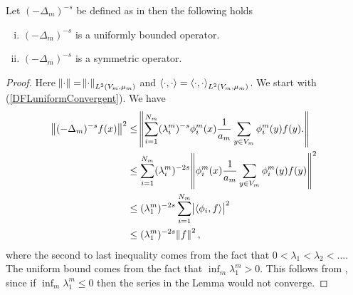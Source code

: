 \medskip
\begin{prop}\label{discreteFractionalLaplacianProperties}Let $(-\Delta_{m})^{-s}$ be defined as in  then the following holds
	\begin{enumerate}[(i)]
			\item $(-\Delta_{m})^{-s}$ is a uniformly bounded operator. \label{DFLuniformConvergent}
			\item $(-\Delta_{m})^{-s}$ is a symmetric operator. \label{DFLsymmetric}
	\end{enumerate}

\end{prop}
\begin{proof}
	Here $\norm{\cdot} = \norm{\cdot}_{L^2(V_m, \mu_m)}$ and $\left\langle \cdot, \cdot \right\rangle = \left\langle \cdot, \cdot \right\rangle_{L^2(V_m, \mu_m)}$. We start with (\ref{DFLuniformConvergent}). We have
	\begin{align}
		\norm{(-\Delta_m)^{-s}f(x)}^2 &\leq \norm{\sum_{i = 1}^{N_m} (\lambda_{i}^{m})^{-s} \phi_{i}^{m}(x) \frac{1}{a_m} \sum_{y \in V_m} \phi_{i}^{m}(y)f(y).} \\
		& \leq \sum_{i = 1}^{N_m} (\lambda_{i}^{m})^{-2s} \norm{\phi_{i}^{m}(x) \frac{1}{a_m} \sum_{y \in V_m} \phi_{i}^{m}(y)f(y)}^2 \\
		& \leq (\lambda_1^{m})^{-2s} \sum_{i =1}^{N_m} \abs{\inn{\phi_i}{f}}^2 \\
		& \leq (\lambda_1^{m})^{-2s} \norm{f}^2,
	\end{align}
	where the second to last inequality comes from the fact that $0 < \lambda_1 < \lambda_{2} < \ldots$. The uniform bound comes from the fact that $\inf_{m} \lambda_{1}^{m} > 0$. This follows from \cite[Lemma 5.2]{specAnal}, since if $\inf_{m} \lambda_{1}^{m} \leq 0$ then the series in the Lemma would not converge.
	

\end{proof}
